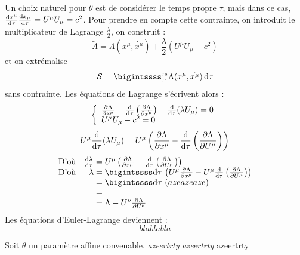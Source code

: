 {\txt Un choix naturel pour $\theta$ est de considérer le temps propre $\tau$, mais dans ce cas, $\frac{\mathrm{d} x^\mu}{\mathrm{d}\tau}\frac{\mathrm{d} x_\mu}{\mathrm{d}\tau}=U^\mu U_\mu=c^2$. Pour prendre en compte cette contrainte, on introduit le multiplicateur de Lagrange $\frac{\lambda}{2}$, on construit :}
$$
	\tilde{\Lambda}=\Lambda(x^\mu,\dot{x^\mu})+\frac{\lambda}{2}(U^\mu U_\mu-c^2)
$$
et on extrémalise 
$$
	\mathcal{S}=\bigintssss_{\tau_1}^{\tau_2} \tilde{\Lambda}(x^\mu,\dot{x^\mu})\,\dif\tau
$$
sans contrainte. Les équations de Lagrange s'écrivent alors :
$$
	\left\{ \begin{array}{l}
		\frac{\partial\Lambda}{\partial x^\mu}-\frac{\mathrm{d}}{\mathrm{d}\tau}\left(\frac{\partial \Lambda}{\partial\dot{x^\mu}}\right)-\frac{\mathrm{d}}{\mathrm{d}\tau}(\lambda U_\mu)=0	\\
		U^\mu U_\mu-c^2=0
	\end{array} \right.
$$
$$
	U^\mu \frac{\mathrm{d}}{\mathrm{d}\tau}(\lambda U_\mu)=U^\mu\left(\frac{\partial\Lambda}{\partial x^\mu}-\frac{\mathrm{d}}{\mathrm{d}\tau}\left(\frac{\partial \Lambda}{\partial U^\mu}\right)\right)
$$
$$
	\begin{array}{lr@{\;}l}
		\text{D'où}&\frac{\dif \lambda}{\dif\tau}&=U^\mu\left(\frac{\partial\Lambda}{\partial x^\mu}-\frac{\dif}{\dif\tau}\left(\frac{\partial \Lambda}{\partial U^\mu}\right)\right)\\
		\text{D'où}&\lambda &=\bigintssss\dif\tau\,\left( U^\mu \frac{\partial\Lambda}{\partial x^\mu}-U^\mu \frac{\dif}{\dif\tau}\left(\frac{\partial \Lambda}{\partial U^\mu}\right)\right)\\
		&&=\bigintssss\dif\tau\,\left(azeazeaze\right)\\
		&&=\\
		&&=\Lambda-U^\nu\frac{\partial \Lambda}{\partial U^\nu}
	\end{array}
$$
Les équations d'Euler-Lagrange deviennent :  
$$
	blablabla
$$

Soit $\theta$ un paramètre affine convenable. \textsl{azeertrty} \emph{azeertrty} azeertrty